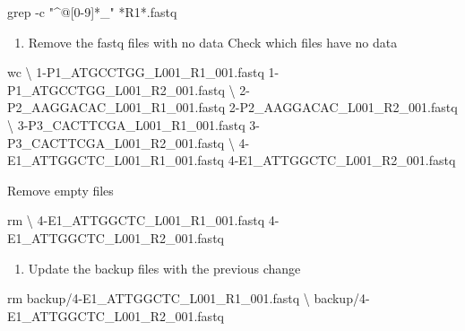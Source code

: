 \documentclass[
  letterpaper,
  DIV=11,
  numbers=noendperiod]{scrreprt}
\newenvironment{Shaded}{\begin{snugshade}}{\end{snugshade}}
\newcommand{\AttributeTok}[1]{\textcolor[rgb]{0.40,0.45,0.13}{#1}}
\newcommand{\DataTypeTok}[1]{\textcolor[rgb]{0.68,0.00,0.00}{#1}}
\newcommand{\FunctionTok}[1]{\textcolor[rgb]{0.28,0.35,0.67}{#1}}
\newcommand{\NormalTok}[1]{\textcolor[rgb]{0.00,0.23,0.31}{#1}}
\newcommand{\PreprocessorTok}[1]{\textcolor[rgb]{0.68,0.00,0.00}{#1}}
\newcommand{\StringTok}[1]{\textcolor[rgb]{0.13,0.47,0.30}{#1}}
\providecommand{\tightlist}{%
  \setlength{\itemsep}{0pt}\setlength{\parskip}{0pt}}\usepackage{longtable,booktabs,array}
\begin{document}
\begin{Shaded}
\begin{Highlighting}[]
\FunctionTok{grep} \AttributeTok{{-}c} \StringTok{"\^{}@[0{-}9]*\_"} \PreprocessorTok{*}\NormalTok{R1}\PreprocessorTok{*}\NormalTok{.fastq}
\end{Highlighting}
\end{Shaded}

\begin{enumerate}
\def\labelenumi{\arabic{enumi}.}
\setcounter{enumi}{4}
\tightlist
\item
  Remove the fastq files with no data Check which files have no data
\end{enumerate}

\begin{Shaded}
\begin{Highlighting}[]
\FunctionTok{wc} \DataTypeTok{\textbackslash{}}
\NormalTok{1{-}P1\_ATGCCTGG\_L001\_R1\_001.fastq 1{-}P1\_ATGCCTGG\_L001\_R2\_001.fastq }\DataTypeTok{\textbackslash{}}
\NormalTok{2{-}P2\_AAGGACAC\_L001\_R1\_001.fastq 2{-}P2\_AAGGACAC\_L001\_R2\_001.fastq }\DataTypeTok{\textbackslash{}}
\NormalTok{3{-}P3\_CACTTCGA\_L001\_R1\_001.fastq 3{-}P3\_CACTTCGA\_L001\_R2\_001.fastq }\DataTypeTok{\textbackslash{}}
\NormalTok{4{-}E1\_ATTGGCTC\_L001\_R1\_001.fastq 4{-}E1\_ATTGGCTC\_L001\_R2\_001.fastq }
\end{Highlighting}
\end{Shaded}

Remove empty files

\begin{Shaded}
\begin{Highlighting}[]
\FunctionTok{rm} \DataTypeTok{\textbackslash{}}
\NormalTok{4{-}E1\_ATTGGCTC\_L001\_R1\_001.fastq 4{-}E1\_ATTGGCTC\_L001\_R2\_001.fastq}
\end{Highlighting}
\end{Shaded}

\begin{enumerate}
\def\labelenumi{\arabic{enumi}.}
\setcounter{enumi}{5}
\tightlist
\item
  Update the backup files with the previous change
\end{enumerate}

\begin{Shaded}
\begin{Highlighting}[]
\FunctionTok{rm}\NormalTok{ backup/4{-}E1\_ATTGGCTC\_L001\_R1\_001.fastq }\DataTypeTok{\textbackslash{}}
\NormalTok{backup/4{-}E1\_ATTGGCTC\_L001\_R2\_001.fastq }
\end{Highlighting}
\end{Shaded}
\end{document}
